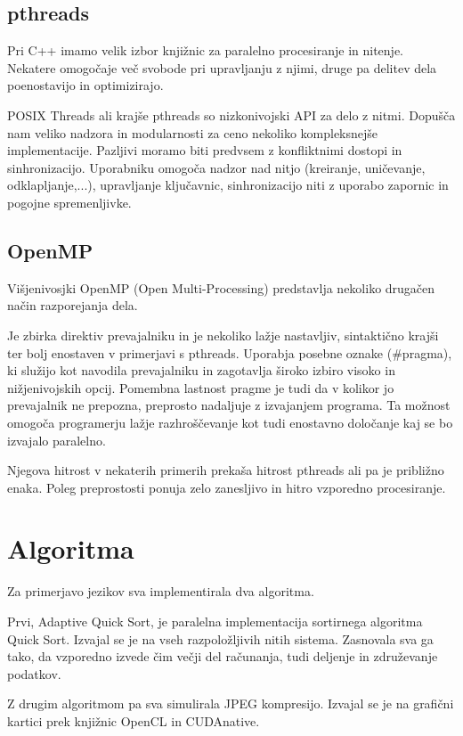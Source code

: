 \documentclass[journal,a4paper,twoside]{sty/IEEEtran}
\begin{document}
\subsection{pthreads}

Pri C++ imamo velik izbor knjižnic za paralelno procesiranje in nitenje.
Nekatere omogočaje več svobode pri upravljanju z njimi, druge pa delitev dela poenostavijo in optimizirajo. 

POSIX Threads ali krajše pthreads so nizkonivojski API za delo z nitmi.
Dopušča nam veliko nadzora in modularnosti za ceno nekoliko kompleksnejše implementacije.
Pazljivi moramo biti predvsem z konfliktnimi dostopi in sinhronizacijo.
Uporabniku omogoča nadzor nad nitjo (kreiranje, uničevanje, odklapljanje,...), upravljanje ključavnic, sinhronizacijo niti z uporabo zapornic in pogojne
	spremenljivke.

\subsection{OpenMP}

Višjenivosjki OpenMP (Open Multi-Processing) predstavlja nekoliko drugačen način razporejanja dela.

Je zbirka direktiv prevajalniku in je nekoliko lažje nastavljiv, sintaktično krajši ter bolj enostaven v primerjavi s pthreads.
Uporabja posebne oznake (\#pragma), ki služijo kot navodila prevajalniku in zagotavlja široko izbiro visoko in nižjenivojskih opcij.
Pomembna lastnost pragme je tudi da v kolikor jo prevajalnik ne prepozna, preprosto nadaljuje z izvajanjem programa. Ta možnost 
omogoča programerju lažje razhroščevanje kot tudi enostavno določanje kaj se bo izvajalo paralelno. 

Njegova hitrost v nekaterih primerih prekaša hitrost pthreads ali pa je približno enaka. Poleg preprostosti ponuja zelo zanesljivo in hitro vzporedno procesiranje.

\section{Algoritma}
Za primerjavo jezikov sva implementirala dva algoritma.

Prvi, Adaptive Quick Sort, je paralelna implementacija sortirnega algoritma Quick Sort.
Izvajal se je na vseh razpoložljivih nitih sistema.
Zasnovala sva ga tako, da vzporedno izvede čim večji del računanja, tudi deljenje in združevanje podatkov.

Z drugim algoritmom pa sva simulirala JPEG kompresijo.
Izvajal se je na grafični kartici prek knjižnic OpenCL in CUDAnative.
\end{document}

